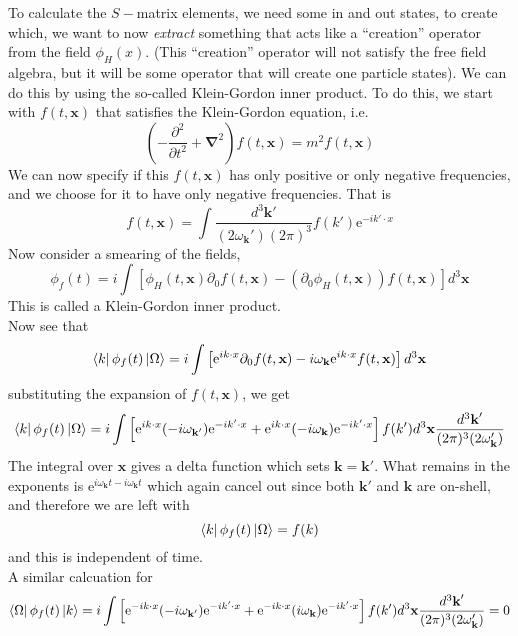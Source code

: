 \documentclass[11pt]{article}
\newcommand{\del}{\partial}
\newcommand{\e}{\mathrm{e}}
\newcommand{\w}{\omega}
\numberwithin{equation}{section}
\begin{document}
To calculate the \(S-\)matrix elements, we need some in and out states, to create which, we want to now \textit{extract} something that acts like a ``creation'' operator from the field \(\phi_H(x)\). (This ``creation'' operator will not satisfy the free field algebra, but it will be some operator that will create one particle states). We can do this by using the so-called Klein-Gordon inner product. To do this, we start with \(f(t, \textbf{x})\) that satisfies the Klein-Gordon equation, i.e. 
\begin{equation*}
    \left(-\frac{\del^2}{\del t^2} + \mathbf{\nabla}^2\right)f(t, \textbf{x}) = m^2f(t, \textbf{x})
\end{equation*}
We can now specify if this \(f(t, \textbf{x})\) has only positive or only negative frequencies, and we choose for it to have only negative frequencies. That is 
\begin{equation*}
    f(t, \textbf{x}) = \int \frac{d^3\textbf{k}'}{(2\w_\textbf{k}')(2\pi)^3} f({k}') \e^{-ik'\cdot x}
\end{equation*}
Now consider a smearing of the fields,
\begin{equation*}
    \phi_f(t) = i \int\left[ \phi_H(t, \textbf{x}) \del_0 f(t, \textbf{x}) - \left( \del_0 \phi_H(t, \textbf{x}) \right) f(t, \textbf{x})  \right]d^3\textbf{x}
\end{equation*}
This is called a Klein-Gordon inner product. \\

Now see that 
\begin{equation*}
    \bra{k}\phi_f(t)\ket{\Omega} = i \int \left[  \e^{ik\cdot x} \del_0f(t, \textbf{x}) - i\w_\textbf{k}\e^{ik\cdot x} f(t, \textbf{x})    \right]d^3\textbf{x}
\end{equation*}
substituting the expansion of \(f(t, \textbf{x})\), we get 
\begin{equation*}
    \bra{k}\phi_f(t)\ket{\Omega} = i\int \left[ \e^{ik\cdot x} (-i\w_{\textbf{k}'}) \e^{-ik'\cdot x} + \e^{ik\cdot x} (-i\w_\textbf{k})   \e^{-ik'\cdot x} \right] f({k}') d^3\textbf{x} \frac{d^3\textbf{k}'}{(2\pi)^3(2\w_\textbf{k}')}
\end{equation*}
The integral over \(\textbf{x}\) gives a delta function which sets \(\textbf{k} = \textbf{k}'\). What remains in the exponents is \(\e^{i\w_\textbf{k}t - i\w_\textbf{k}t}\) which again cancel out since both \(\textbf{k}'\) and \(\textbf{k}\) are on-shell, and therefore we are left with 
\begin{equation*}
    \bra{k}\phi_f(t)\ket{\Omega} =  f({k}) 
\end{equation*}
and this is independent of time.\\
A similar calcuation for 
\begin{equation*}
    \bra{\Omega}\phi_f(t)\ket{k}  = i\int \left[ \e^{-ik\cdot x} (-i\w_{\textbf{k}'}) \e^{-ik'\cdot x} + \e^{-ik\cdot x} (i\w_\textbf{k})   \e^{-ik'\cdot x} \right] f({k}') d^3\textbf{x} \frac{d^3\textbf{k}'}{(2\pi)^3(2\w_\textbf{k}')} = 0
\end{equation*}
\end{document}
